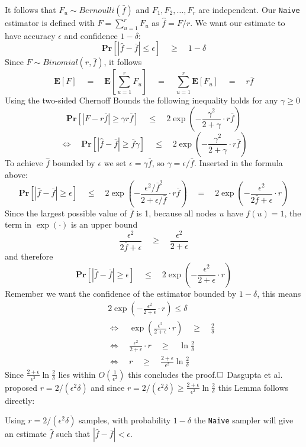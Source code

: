 It follows that $F_u \sim  Bernoulli(\bar{f})$ and $F_1, F_2, \ldots , F_r$ are independent.
Our \texttt{Naive} estimator is defined with $F = \sum_{u=1}^{r} F_u$ as $\hat{f} = F/r$.
We want our estimate to have accuracy $\epsilon$ and confidence $1-\delta$:
$$\textbf{Pr}[|\hat{f}-\bar{f} | \leq \epsilon] \quad\geq\quad 1-\delta$$
Since $F \sim Binomial(r,\bar{f})$, it follows
$$\textbf{E}[F] \quad=\quad \textbf{E}[\sum_{u=1}^{r} F_u] \quad=\quad \sum_{u=1}^{r}\textbf{E}[F_u] \quad=\quad r\bar{f}$$
Using the two-sided Chernoff Bounds the following inequality holds for any $\gamma \geq 0$
$$\textbf{Pr}[|F-r\bar{f}|\geq \gamma r\bar{f}] \quad\leq\quad 2\exp(-\frac{\gamma^2}{2+\gamma}\cdot r\bar{f})$$
$$\Leftrightarrow\quad \textbf{Pr}[|\hat{f}-\bar{f}|\geq \bar{f}\gamma] \quad\leq\quad 2\exp(-\frac{\gamma^2}{2+\gamma}\cdot r\bar{f})$$
To achieve $\hat{f}$ bounded by $\epsilon$ we set $\epsilon = \gamma\bar{f}$, so $\gamma = \epsilon/\bar{f}$. Inserted in the formula above:
$$\textbf{Pr}[|\hat{f}-\bar{f}| \geq \epsilon] \quad\leq\quad 2\exp (-\frac{\epsilon^2/\bar{f}^2}{2+\epsilon/\bar{f}}\cdot r\bar{f}) \quad=\quad 2\exp(-\frac{\epsilon^2}{2\bar{f}+\epsilon}\cdot r)$$
Since the largest possible value of $\bar{f}$ is 1, because all nodes $u$ have $f(u) = 1$, the term in $\exp(\cdot)$ is an upper bound
$$\frac{\epsilon^2}{2\bar{f}+\epsilon} \quad\geq\quad \frac{\epsilon^2}{2+\epsilon}$$
and therefore
$$\textbf{Pr}[|\hat{f}-\bar{f}| \geq \epsilon] \quad\leq\quad 2\exp(-\frac{\epsilon^2}{2+\epsilon}\cdot r)$$
Remember we want the confidence of the estimator bounded by $1-\delta$, this means
\begin{align*}
\quad&2\exp(-\frac{\epsilon^2}{2+\epsilon}\cdot r) \leq \delta\\
&\Leftrightarrow\quad \exp(\frac{\epsilon^2}{2+\epsilon}\cdot r) \quad\geq\quad \frac{2}{\delta}\\
&\Leftrightarrow\quad \frac{\epsilon^2}{2+\epsilon}\cdot r \quad\geq\quad \ln\frac{2}{\delta}\\
&\Leftrightarrow\quad r \quad\geq\quad \frac{2+\epsilon}{\epsilon^2}\ln\frac{2}{\delta}
\end{align*}
Since $\frac{2+\epsilon}{\epsilon^2}\ln\frac{2}{\delta}$ lies within $O(\frac{1}{\epsilon^2})$ this concludes the proof.$\hfill\square$
\newline\newline
Dasgupta et al. \cite{dasgupta2012social} proposed $r=2/(\epsilon^2\delta)$ and since $r=2/(\epsilon^2\delta) \geq \frac{2+\epsilon}{\epsilon^2}\ln\frac{2}{\delta}$ this Lemma follows directly:
\begin{lemma}
Using $r=2/(\epsilon^2\delta)$ samples, with probability $1-\delta$ the \texttt{Naive} sampler will give an estimate $\hat{f}$ such that $|\hat{f}-\bar{f}|< \epsilon$.
\end{lemma}
